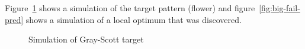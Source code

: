 Figure~\ref{fig:big-fail-true} shows a simulation of the target pattern (flower) and figure~\ref{fig:big-fail-pred} shows a simulation of a local optimum that was discovered.

\begin{figure}[!h]
            \hfill
            \hfill
            \hfill
            \hfill
            \hfill
            \caption{Simulation of Gray-Scott target}
\label{fig:big-fail-true}
\end{figure}

